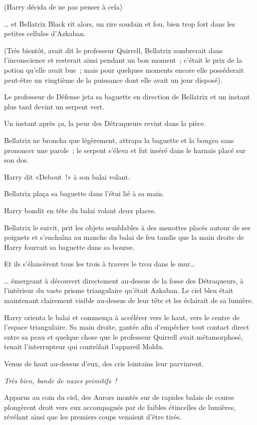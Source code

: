 (Harry décida de ne pas penser à cela)

… et Bellatrix Black rit alors, un rire soudain et fou, bien trop fort dans les petites cellules d'Azkaban.

(Très bientôt, avait dit le professeur Quirrell, Bellatrix sombrerait dans l'inconscience et resterait ainsi pendant un bon moment~; c'était le prix de la potion qu'elle avait bue~; mais pour quelques moments encore elle posséderait peut-être un vingtième de la puissance dont elle avait un jour disposé).

Le professeur de Défense jeta sa baguette en direction de Bellatrix et un instant plus tard devint un serpent vert.

Un instant après \emph{ça}, la peur des Détraqueurs revint dans la pièce.

Bellatrix ne broncha que légèrement, attrapa la baguette et la bougea sans prononcer une parole~; le serpent s'éleva et fut inséré dans le harnais placé sur son dos.

Harry dit «Debout~!» à son balai volant.

Bellatrix plaça sa baguette dans l'étui lié à sa main.

Harry bondit en tête du balai volant deux places.

Bellatrix le suivit, prit les objets semblables à des menottes placés autour de ses poignets et s'enchaîna au manche du balai de feu tandis que la main droite de Harry fourrait sa baguette dans sa bourse.

Et ils s'élancèrent tous les trois à travers le trou dans le mur…

… émergeant à découvert directement au-dessus de la fosse des Détraqueurs, à l'intérieur du vaste prisme triangulaire qu'était Azkaban. Le ciel bleu était maintenant clairement visible au-dessus de leur tête et les éclairait de sa lumière.

Harry orienta le balai et commença à accélérer vers le haut, vers le centre de l'espace triangulaire. Sa main droite, gantée afin d'empêcher tout contact direct entre sa peau et quelque chose que le professeur Quirrell avait métamorphosé, tenait l'interrupteur qui contrôlait l'appareil Moldu.

Venus de haut au-dessus d'eux, des cris lointains leur parvinrent.

\emph{Très bien, bande de nazes primitifs~!}

Apparus au coin du ciel, des Aurors montés sur de rapides balais de course plongèrent droit vers eux accompagnés par de faibles étincelles de lumières, révélant ainsi que les premiers coups venaient d'être tirés.

